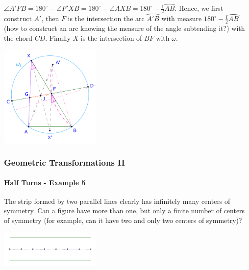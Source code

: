 \documentclass[8pt,xcolor=table,dvipsnames]{beamer}
\providecommand{\half}{\frac{1}{2}}
\newcommand{\dg}{^\circ}
\newcommand{\arc}[1]{\wideparen{#1}}
\begin{document}
\begin{frame}[t]
\begin{overprint}
\begin{center}
        \end{center}
        $\angle A'FB = 180\dg - \angle F'XB = 180\dg - \angle AXB = 180\dg - \half \arc{AB}.$
        \bigbreak
        Hence, we first construct $A'$, then $F$ is the intersection the arc $\arc{A'B}$ with measure $180\dg - \half \arc{AB}$
        (how to construct an arc knowing the measure of the angle subtending it?) with the chord $CD.$
        \bigbreak
        Finally $X$ is the intersection of $BF$ with $\omega.$
        \begin{center}
            \includegraphics[width=5cm]{./svg/pdf/rotation-3e.pdf}
        \end{center}
    \end{overprint}
\end{frame}

\begin{frame}[t]
    \frametitle{Geometric Transformations II}
    \framesubtitle{Half Turns - Example 5}
    \begin{example}
        The strip formed by two parallel lines clearly has infinitely many centers of symmetry.
        Can a figure have more than one, but only a finite number of centers of symmetry (for example, can it have two and only two centers of symmetry)?
    \end{example}

    \begin{center}
        \includegraphics[width=5cm]{./svg/pdf/rotation-9.pdf}
    \end{center}
\end{frame}
\end{document}
